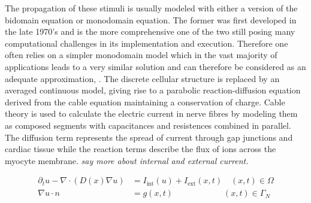 \documentclass[../draft_1.tex]{subfiles}
\begin{document}
The propagation of these stimuli is usually modeled with either a version of the bidomain equation or monodomain equation. The former was first developed in the late 1970's and is the more comprehensive one of the two still posing many computational challenges in its implementation and execution. Therefore one often relies on a simpler monodomain model which in the vast majority of applications leads to a very similar solution and can therefore be considered as an adequate approximation, \cite{potse2006comparison}. The discrete cellular structure is replaced by an averaged continuous model, giving rise to a parabolic reaction-diffusion equation derived from the cable equation maintaining a conservation of charge. Cable theory is used to calculate the electric current in nerve fibres by modeling them as composed segments with capacitances and resistences combined in parallel. 
The diffusion term represents the spread of current through gap junctions and cardiac tissue while the reaction terms describe the flux of ions across the myocyte membrane. \textit{say more about internal and external current.}
\begin{ceqn}
\begin{equation}
\begin{aligned}
\partial_t u - \nabla \cdot ( D(x) \nabla u) &= I_{\text{int}}(u) + I_{\text{ext}}(x,t)  \quad  (x,t) \in \Omega \\
\nabla u \cdot n &= g(x,t) \qquad \qquad \qquad (x,t) \in \Gamma_N \\
\end{aligned}
\end{equation}
\end{ceqn}
\end{document}
